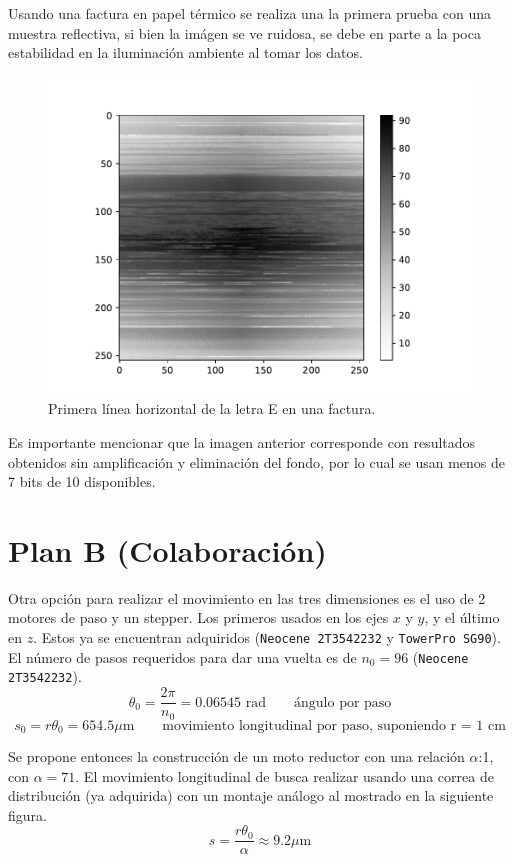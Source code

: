 \documentclass[11pt]{article}
\begin{document}
	Usando una factura en papel térmico se realiza una la primera prueba con una muestra reflectiva, si bien la imágen se ve ruidosa, se debe en parte a la poca estabilidad en la iluminación ambiente al tomar los datos.
	\begin{figure}[h]
		\centering
		\includegraphics[width=0.7\linewidth]{complete.pdf}
		\caption{Primera línea horizontal de la letra E en una factura.}
	\end{figure}

	Es importante mencionar que la imagen anterior corresponde con resultados obtenidos sin amplificación y eliminación del fondo, por lo cual se usan menos de 7 bits de 10 disponibles.
	\newpage
	
	\section{Plan B (Colaboración)}
	Otra opción para realizar el movimiento en las tres dimensiones es el uso de 2 motores de paso y un stepper. Los primeros usados en los ejes $x$ y $y$, y el último en $z$. Estos ya se encuentran adquiridos (\texttt{Neocene 2T3542232} y \texttt{TowerPro SG90}). El número de pasos requeridos para dar una vuelta es de $n_0 = 96$ (\texttt{Neocene 2T3542232}).
	\begin{equation}
		\theta_0 = \dfrac{2\pi}{n_0}= 0.06545 \text{ rad} \qquad \text{\'angulo por paso}
	\end{equation}
	\begin{equation}
		s_0 = r\theta_0 = 654.5 \mu\text{m} \qquad \text{movimiento longitudinal por paso, suponiendo r = 1 cm}
	\end{equation}
	
	Se propone entonces la construcción de un moto reductor con una relación $\alpha$:1, con $\alpha = 71$. El movimiento longitudinal de busca realizar usando una correa de distribución (ya adquirida) con un montaje análogo al mostrado en la siguiente figura.
	\begin{equation}
		s = \dfrac{r\theta_0}{\alpha} \approx 9.2 \mu\text{m}
	\end{equation}
	
\end{document}
